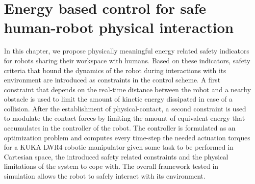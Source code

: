 \chapter[Energy based safe control]{Energy based control for safe human-robot physical interaction}
\label{chap:safety}
\begin{synopsis}
In this chapter, we propose physically meaningful energy related safety indicators for robots sharing their workspace with humans.
Based on these indicators, safety criteria that bound the dynamics of the robot during interactions with its environment are introduced as constraints in the control scheme. A first constraint that depends on the real-time distance between the robot and a nearby obstacle is used to limit the amount of kinetic energy dissipated in case of a collision. After the establishment of physical-contact, a second constraint is used to modulate the contact forces by limiting the amount of equivalent energy that accumulates in the controller of the robot. The controller
is formulated as an optimization problem and computes every time-step
the needed actuation torques for a KUKA LWR4 robotic manipulator given some task to
be performed in Cartesian space, the introduced safety related constraints and the physical limitations of the system to cope with. The overall framework tested in simulation allows the robot to safely interact with its environment.
\end{synopsis}
